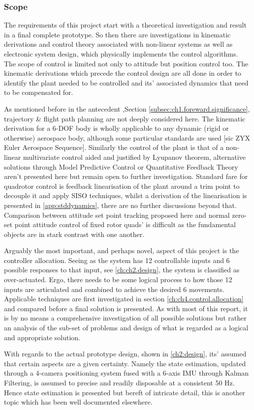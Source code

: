\subsubsection{Scope}
\label{subsubsec:ch1.foreward.scope}
The requirements of this project start with a theoretical investigation and result in a final complete prototype. So then there are investigations in kinematic derivations and control theory associated with non-linear systems as well as electronic system design, which physically implements the control algorithms. The scope of control is limited not only to attitude but position control too. The kinematic derivations which precede the control design are all done in order to identify the plant needed to be controlled and its' associated dynamics that need to be compensated for.
\par
As mentioned before in the antecedent ,Section \ref{subsec:ch1.foreward.significance}, trajectory \& flight path planning are not deeply considered here. The kinematic derivation for a 6-DOF body is wholly applicable to any dynamic (rigid or otherwise) aerospace body, although some particular standards are used [sic ZYX Euler Aerospace Sequence]. Similarly the control of the plant is that of a non-linear multivariate control aided and justified by Lyupanov theorem, alternative solutions through Model Predictive Control or Quantitative Feedback Theory aren't presented here but remain open to further investigation. Standard fare for quadrotor control is feedback linearisation of the plant around a trim point to decouple it and apply SISO techniques, whilst a derivation of the linearisation is presented in \ref{app:stddynamics}, there are no further discussions beyond that. Comparison between attitude set point tracking proposed here and normal zero-set point attitude control of fixed rotor quads' is difficult as the fundamental objects are in stark contrast with one another.
\par
Arguably the most important, and perhaps novel, aspect of this project is the controller allocation. Seeing as the system has 12 controllable inputs and 6 possible responses to that input, see \ref{ch:ch2.design}, the system is classified as over-actuated. Ergo, there needs to be some logical process to how those 12 inputs are articulated and combined to achieve the desired 6 movements. Applicable techniques are first investigated in section \ref{ch:ch4.control.allocation} and compared before a final solution is presented. As with most of this report, it is by no means a comprehensive investigation of all possible solutions but rather an analysis of the sub-set of problems and design of what is regarded as a logical and appropriate solution.
\par
With regards to the actual prototype design, shown in \ref{ch2:design}, its' assumed that certain aspects are a given certainty. Namely the state estimation, updated through a 4-camera positioning system fused with a 6-axis IMU through Kalman Filtering, is assumed to precise and readily disposable at a consistent 50 Hz. Hence state estimation is presented but bereft of intricate detail, this is another topic which has been well documented elsewhere.
